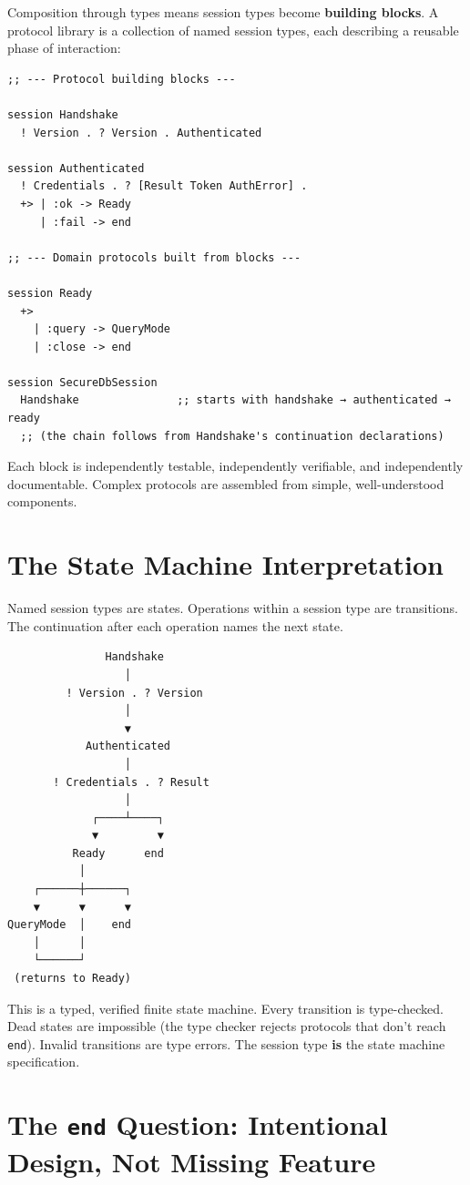 \documentclass[11pt]{article}
\begin{document}
Composition through types means session types become \textbf{building blocks}. A
protocol library is a collection of named session types, each describing a
reusable phase of interaction:

\begin{verbatim}
;; --- Protocol building blocks ---

session Handshake
  ! Version . ? Version . Authenticated

session Authenticated
  ! Credentials . ? [Result Token AuthError] .
  +> | :ok -> Ready
     | :fail -> end

;; --- Domain protocols built from blocks ---

session Ready
  +>
    | :query -> QueryMode
    | :close -> end

session SecureDbSession
  Handshake               ;; starts with handshake → authenticated → ready
  ;; (the chain follows from Handshake's continuation declarations)
\end{verbatim}

Each block is independently testable, independently verifiable, and
independently documentable. Complex protocols are assembled from simple,
well-understood components.
\section{The State Machine Interpretation}
\label{sec:org8db9adc}

Named session types are states. Operations within a session type are
transitions. The continuation after each operation names the next state.

\begin{verbatim}
               Handshake
                  │
         ! Version . ? Version
                  │
                  ▼
            Authenticated
                  │
       ! Credentials . ? Result
                  │
             ┌────┴────┐
             ▼         ▼
          Ready      end
           │
    ┌──────┼──────┐
    ▼      ▼      ▼
QueryMode  │    end
    │      │
    └──────┘
 (returns to Ready)
\end{verbatim}

This is a typed, verified finite state machine. Every transition is
type-checked. Dead states are impossible (the type checker rejects protocols
that don't reach \texttt{end}). Invalid transitions are type errors. The session type
\textbf{is} the state machine specification.
\section{The \texttt{end} Question: Intentional Design, Not Missing Feature}
\label{sec:org59a0019}
\end{document}
